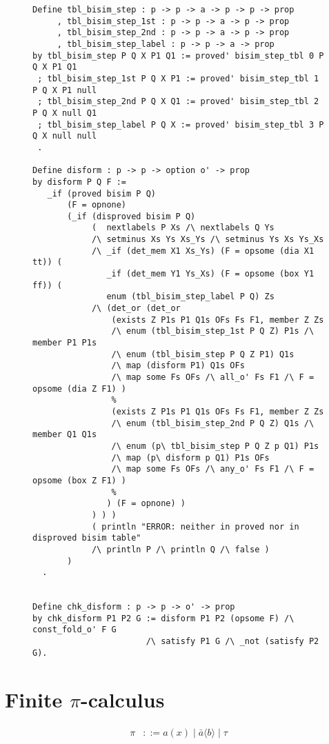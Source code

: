 \documentclass{llncs}
\begin{document}
\begin{figure}
\begin{verbatim}
Define tbl_bisim_step : p -> p -> a -> p -> p -> prop
     , tbl_bisim_step_1st : p -> p -> a -> p -> prop
     , tbl_bisim_step_2nd : p -> p -> a -> p -> prop
     , tbl_bisim_step_label : p -> p -> a -> prop
by tbl_bisim_step P Q X P1 Q1 := proved' bisim_step_tbl 0 P Q X P1 Q1
 ; tbl_bisim_step_1st P Q X P1 := proved' bisim_step_tbl 1 P Q X P1 null
 ; tbl_bisim_step_2nd P Q X Q1 := proved' bisim_step_tbl 2 P Q X null Q1
 ; tbl_bisim_step_label P Q X := proved' bisim_step_tbl 3 P Q X null null
 .

Define disform : p -> p -> option o' -> prop
by disform P Q F :=
   _if (proved bisim P Q)
       (F = opnone)
       (_if (disproved bisim P Q)
            (  nextlabels P Xs /\ nextlabels Q Ys
            /\ setminus Xs Ys Xs_Ys /\ setminus Ys Xs Ys_Xs
            /\ _if (det_mem X1 Xs_Ys) (F = opsome (dia X1 tt)) (
               _if (det_mem Y1 Ys_Xs) (F = opsome (box Y1 ff)) (
               enum (tbl_bisim_step_label P Q) Zs
            /\ (det_or (det_or
                (exists Z P1s P1 Q1s OFs Fs F1, member Z Zs
                /\ enum (tbl_bisim_step_1st P Q Z) P1s /\ member P1 P1s
                /\ enum (tbl_bisim_step P Q Z P1) Q1s
                /\ map (disform P1) Q1s OFs
                /\ map some Fs OFs /\ all_o' Fs F1 /\ F = opsome (dia Z F1) )
                %
                (exists Z P1s P1 Q1s OFs Fs F1, member Z Zs
                /\ enum (tbl_bisim_step_2nd P Q Z) Q1s /\ member Q1 Q1s 
                /\ enum (p\ tbl_bisim_step P Q Z p Q1) P1s
                /\ map (p\ disform p Q1) P1s OFs
                /\ map some Fs OFs /\ any_o' Fs F1 /\ F = opsome (box Z F1) )
                %
               ) (F = opnone) )
            ) ) )
            ( println "ERROR: neither in proved nor in disproved bisim table"
            /\ println P /\ println Q /\ false )
       )
  .


Define chk_disform : p -> p -> o' -> prop
by chk_disform P1 P2 G := disform P1 P2 (opsome F) /\ const_fold_o' F G
                       /\ satisfy P1 G /\ _not (satisfy P2 G).
\end{verbatim}
\end{figure}



\section{Finite $\pi$-calculus}\label{sec:pic}
\begin{align*}
\pi &::= a(x) \mid \bar a\langle b \rangle  \mid\tau
\end{align*}
\end{document}
